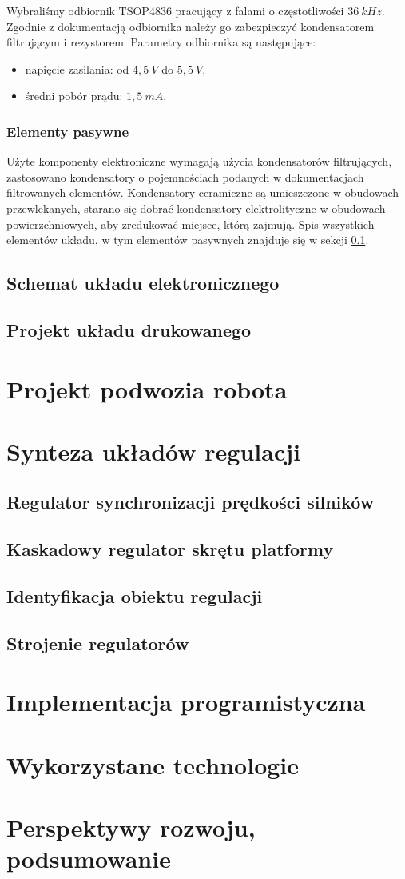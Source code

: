 \documentclass[11pt]{article}
\begin{document}
Wybraliśmy odbiornik TSOP4836 pracujący z falami o częstotliwości $ 36\ kHz $. Zgodnie z dokumentacją %
 odbiornika należy go zabezpieczyć kondensatorem filtrującym i rezystorem. Parametry odbiornika są następujące:
\begin{itemize}
	\item napięcie zasilania: od $ 4,5\ V $ do $ 5,5\ V $,
	\item średni pobór prądu: $ 1,5\ mA$.
\end{itemize}

\subsubsection{Elementy pasywne}
Użyte komponenty elektroniczne wymagają użycia kondensatorów filtrujących, zastosowano kondensatory o pojemnościach podanych w dokumentacjach filtrowanych elementów.
Kondensatory ceramiczne są umieszczone w obudowach przewlekanych, starano się dobrać kondensatory elektrolityczne w obudowach powierzchniowych, aby zredukować miejsce, którą zajmują.
Spis wszystkich elementów układu, w tym elementów pasywnych znajduje się w sekcji \ref{sec:schem}.
\subsection{Schemat układu elektronicznego}
\label{sec:schem}
\subsection{Projekt układu drukowanego}


\section{Projekt podwozia robota}

\section{Synteza układów regulacji}
\subsection{Regulator synchronizacji prędkości silników}
\subsection{Kaskadowy regulator skrętu platformy}
\subsection{Identyfikacja obiektu regulacji}
\subsection{Strojenie regulatorów}

\section{Implementacja programistyczna}

\section{Wykorzystane technologie}

\section{Perspektywy rozwoju, podsumowanie}
\end{document}
